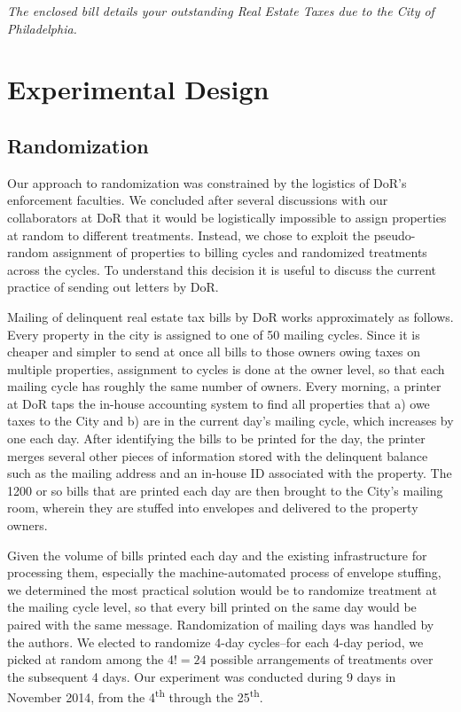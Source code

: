 \documentclass[12pt,titlepage]{article}
\begin{document}
{\it The enclosed bill details your outstanding Real Estate Taxes due
  to the City of Philadelphia.}

\section{Experimental Design}

\subsection{Randomization}

Our approach to randomization was constrained by the logistics of
DoR's enforcement faculties. We concluded after several discussions
with our collaborators at DoR that it would be logistically impossible
to assign properties at random to different treatments. Instead, we
chose to exploit the pseudo-random assignment of properties to billing
cycles and randomized treatments across the cycles.  To understand
this decision it is useful to discuss the current practice of sending
out letters by DoR.

Mailing of delinquent real estate tax bills by DoR works approximately as
follows.  Every property in the city is assigned to one of 50 mailing
cycles. Since it is cheaper and simpler to send at once all bills to
those owners owing taxes on multiple properties, assignment to cycles
is done at the owner level, so that each mailing cycle has roughly the
same number of owners.  Every morning, a printer at DoR taps the
in-house accounting system to find all properties that a) owe taxes to
the City and b) are in the current day's mailing cycle, which
increases by one each day. After identifying the bills to be printed
for the day, the printer merges several other pieces of information
stored with the delinquent balance such as the mailing address and an
in-house ID associated with the property. The 1200 or so bills that
are printed each day are then brought to the City's mailing room,
wherein they are stuffed into envelopes and delivered to the property
owners.

Given the volume of bills printed each day and the existing
infrastructure for processing them, especially the machine-automated
process of envelope stuffing, we determined the most practical
solution would be to randomize treatment at the mailing cycle level,
so that every bill printed on the same day would be paired with the
same message. Randomization of mailing days was handled by the
authors. We elected to randomize 4-day cycles--for each 4-day period,
we picked at random among the $4!=24$ possible arrangements of
treatments over the subsequent 4 days. Our experiment was conducted
during 9 days in November 2014, from the 4\textsuperscript{th} through
the 25\textsuperscript{th}.
\end{document}
